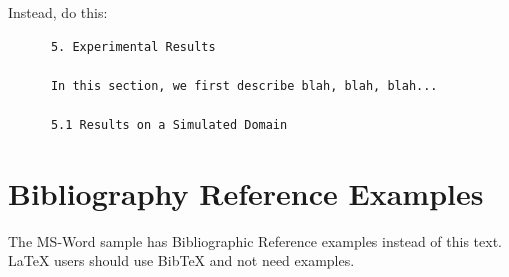 \documentclass[twoside,11pt]{article}
\begin{document}
Instead, do this: 
\begin{verbatim}      5. Experimental Results 

      In this section, we first describe blah, blah, blah... 

      5.1 Results on a Simulated Domain 
\end{verbatim}



\newpage

\appendix
\section{Bibliography Reference Examples}

The MS-Word sample has Bibliographic Reference examples instead of this text.  \LaTeX{} users should use BibTeX and not need examples.


\end{document}
